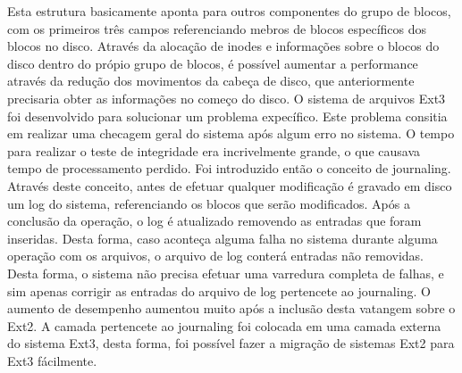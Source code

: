 Esta estrutura basicamente aponta para outros componentes do grupo de blocos, com os primeiros três campos referenciando mebros de blocos específicos dos blocos no disco. Através da alocação de inodes e informações sobre o blocos do disco dentro do própio grupo de blocos, é possível aumentar a performance através da redução dos movimentos da cabeça de disco, que anteriormente precisaria obter as informações no começo do disco.
O sistema de arquivos Ext3 foi desenvolvido para solucionar um problema expecífico. Este problema consitia em realizar uma checagem geral do sistema após algum erro no sistema. O tempo para realizar o teste de integridade era incrivelmente grande, o que causava tempo de processamento perdido. Foi introduzido então o conceito de  journaling. Através deste conceito, antes de efetuar qualquer modificação é gravado em disco um log do sistema, referenciando os blocos que serão modificados. Após a conclusão da operação, o log é atualizado removendo as entradas que foram inseridas. Desta forma, caso aconteça alguma falha no sistema durante alguma operação com os arquivos, o arquivo de log conterá entradas não removidas. Desta forma, o sistema não precisa efetuar uma varredura completa de falhas, e sim apenas corrigir as entradas do arquivo de log  pertencete ao journaling.
O aumento de desempenho aumentou muito após a inclusão desta vatangem sobre o Ext2. A camada pertencete ao journaling foi colocada em uma camada externa do sistema Ext3, desta forma, foi possível fazer a migração de sistemas Ext2 para Ext3 fácilmente.

